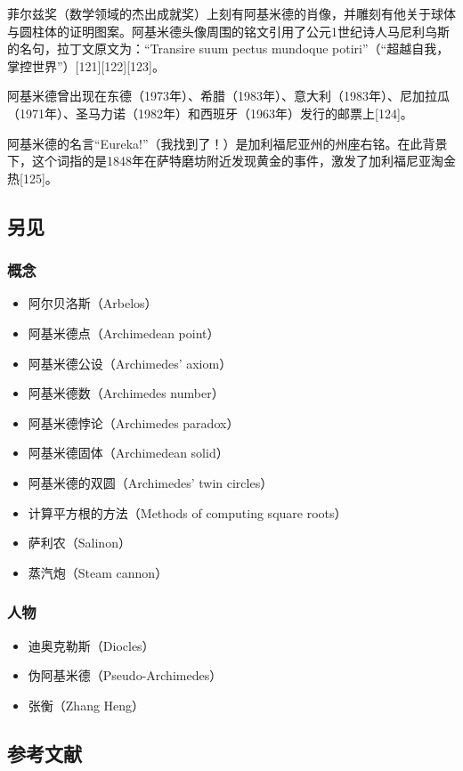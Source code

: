 菲尔兹奖（数学领域的杰出成就奖）上刻有阿基米德的肖像，并雕刻有他关于球体与圆柱体的证明图案。阿基米德头像周围的铭文引用了公元1世纪诗人马尼利乌斯的名句，拉丁文原文为：“Transire suum pectus mundoque potiri”（“超越自我，掌控世界”）[121][122][123]。

阿基米德曾出现在东德（1973年）、希腊（1983年）、意大利（1983年）、尼加拉瓜（1971年）、圣马力诺（1982年）和西班牙（1963年）发行的邮票上[124]。

阿基米德的名言“Eureka!”（我找到了！）是加利福尼亚州的州座右铭。在此背景下，这个词指的是1848年在萨特磨坊附近发现黄金的事件，激发了加利福尼亚淘金热[125]。
\subsection{另见}
\subsubsection{概念}  
\begin{itemize}
\item 阿尔贝洛斯（Arbelos）  
\item 阿基米德点（Archimedean point）  
\item 阿基米德公设（Archimedes' axiom）  
\item 阿基米德数（Archimedes number）  
\item 阿基米德悖论（Archimedes paradox）  
\item 阿基米德固体（Archimedean solid）  
\item 阿基米德的双圆（Archimedes' twin circles）  
\item 计算平方根的方法（Methods of computing square roots）  
\item 萨利农（Salinon）  
\item 蒸汽炮（Steam cannon） 
\end{itemize} 
\subsubsection{人物}  
\begin{itemize}
\item 迪奥克勒斯（Diocles）  
\item 伪阿基米德（Pseudo-Archimedes）  
\item 张衡（Zhang Heng）
\end{itemize}
\subsection{参考文献}  
